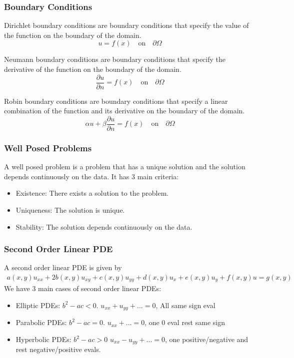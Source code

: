 \documentclass[answers,12pt,addpoints]{exam}
\begin{document}
    \subsubsection{Boundary Conditions}
    \begin{definition}
        Dirichlet boundary conditions are boundary conditions that specify the value of the function on the boundary of the domain.
        $$ u = f(x) \quad \text{on} \quad \partial \Omega$$
    \end{definition}
    \begin{definition}
        Neumann boundary conditions are boundary conditions that specify the derivative of the function on the boundary of the domain.
        $$ \frac{\partial u}{\partial n} = f(x) \quad \text{on} \quad \partial \Omega$$
    \end{definition}
    \begin{definition}
        Robin boundary conditions are boundary conditions that specify a linear combination of the function and its derivative on the boundary of the domain.
        $$ \alpha u + \beta \frac{\partial u}{\partial n} = f(x) \quad \text{on} \quad \partial \Omega$$
    \end{definition}
    \subsubsection{Well Posed Problems}
    A well posed problem is a problem that has a unique solution and the solution depends continuously on the data. It has 3 main criteria:
    \begin{itemize}
        \item Existence: There exists a solution to the problem.
        \item Uniqueness: The solution is unique.
        \item Stability: The solution depends continuously on the data.
    \end{itemize}
    \subsubsection{Second Order Linear PDE}
    A second order linear PDE is given by
    \begin{align*}
        a(x, y)u_{xx} + 2b(x, y)u_{xy} + c(x, y)u_{yy} + d(x, y)u_x + e(x, y)u_y + f(x, y)u = g(x, y)
    \end{align*}
    We have 3 main cases of second order linear PDEs:
    \begin{itemize}
        \item Elliptic PDEs: $b^2 - ac < 0$. $u_{xx} + u_{yy} + ... = 0$, All same sign eval
        \item Parabolic PDEs: $b^2 - ac = 0$. $u_{xx} + ... = 0$, one 0 eval rest same sign
        \item Hyperbolic PDEs: $b^2 - ac > 0$ $ u_{xx} - u_{yy} + ... = 0$, one positive/negative and rest negative/positive evals.
    \end{itemize}
\end{document}
